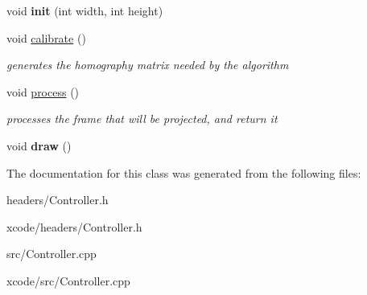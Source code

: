 \begin{DoxyCompactItemize}
\item 
\hypertarget{class_controller_a53e2dfd2b170b86a607fb23f69c13859}{void {\bfseries init} (int width, int height)}\label{class_controller_a53e2dfd2b170b86a607fb23f69c13859}

\item 
\hypertarget{class_controller_a3281d6167b17007535c5414c5c409b4b}{void \hyperlink{class_controller_a3281d6167b17007535c5414c5c409b4b}{calibrate} ()}\label{class_controller_a3281d6167b17007535c5414c5c409b4b}

\begin{DoxyCompactList}\small\item\em generates the homography matrix needed by the algorithm \end{DoxyCompactList}\item 
\hypertarget{class_controller_a7ac58195c3342b7de52b762c0d759a3c}{void \hyperlink{class_controller_a7ac58195c3342b7de52b762c0d759a3c}{process} ()}\label{class_controller_a7ac58195c3342b7de52b762c0d759a3c}

\begin{DoxyCompactList}\small\item\em processes the frame that will be projected, and return it \end{DoxyCompactList}\item 
\hypertarget{class_controller_a02fdbce18ccb7becaa2aa9fd8fc4aa2b}{void {\bfseries draw} ()}\label{class_controller_a02fdbce18ccb7becaa2aa9fd8fc4aa2b}

\end{DoxyCompactItemize}


The documentation for this class was generated from the following files\-:\begin{DoxyCompactItemize}
\item 
headers/Controller.\-h\item 
xcode/headers/Controller.\-h\item 
src/Controller.\-cpp\item 
xcode/src/Controller.\-cpp\end{DoxyCompactItemize}
